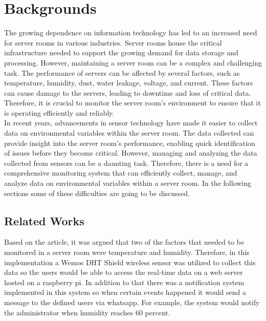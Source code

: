 \section{Backgrounds}
The growing dependence on information technology has led to an increased need for server rooms in various industries. Server rooms house the critical infrastructure needed to support the growing demand for data storage and processing. However, maintaining a server room can be a complex and challenging task. The performance of servers can be affected by several factors, such as temperature, humidity, dust, water leakage, voltage, and current. These factors can cause damage to the servers, leading to downtime and loss of critical data. Therefore, it is crucial to monitor the server room's environment to ensure that it is operating efficiently and reliably.\\

In recent years, advancements in sensor technology have made it easier to collect data on environmental variables within the server room. The data collected can provide insight into the server room's performance, enabling quick identification of issues before they become critical. However, managing and analyzing the data collected from sensors can be a daunting task. Therefore, there is a need for a comprehensive monitoring system that can efficiently collect, manage, and analyze data on environmental variables within a server room. In the following sections some of these difficulties are going to be discussed.
\subsection{Related Works}
Based on the article\cite{kurniawan2019smart}, it was argued that two of the factors that needed to be monitored in a server room were temperature and humidity. Therefore, in this implementation a Wemos DHT Shield wireless sensor was utilized to collect this data so the users would be able to access the real-time data on a web server hosted on a raspberry pi. In addition to that there was a notification system implemented in this system so when certain events happened it would send a message to the defined users via whatsapp. For example, the system would notify the administrator when humidity reaches 60 percent.\\

